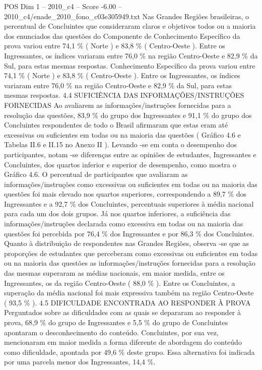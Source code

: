 \begin{textsample}{POS Dim 1 – 2010\_c4 – Score -6.00 – 2010\_c4/enade\_2010\_fono\_c03e305949.txt}
Nas Grandes Regiões brasileiras, o percentual de Concluintes que consideraram claros e objetivos todos ou a maioria dos enunciados das questões do Componente de Conhecimento Específico da prova variou entre 74,1 \% ( Norte ) e 83,8 \% ( Centro-Oeste ).
Entre os Ingressantes, os índices variaram entre 76,0 \% na região Centro-Oeste e 82,9 \% da Sul, para estas mesmas respostas.
Conhecimento Específico da prova variou entre 74,1 \% ( Norte ) e 83,8 \% ( Centro-Oeste ).
Entre os Ingressantes, os índices variaram entre 76,0 \% na região Centro-Oeste e 82,9 \% da Sul, para estas mesmas respostas. 4.4 SUFICIÊNCIA DAS INFORMAÇÕES/INSTRUÇÕES FORNECIDAS Ao avaliarem as informações/instruções fornecidas para a resolução das questões, 83,9 \% do grupo dos Ingressantes e 91,1 \% do grupo dos Concluintes respondentes de todo o Brasil afirmaram que estas eram até excessivas ou suficientes em todas ou na maioria das questões ( Gráfico 4.6 e Tabelas II.6 e II.15 no Anexo II ).
Levando -se em conta o desempenho dos participantes, notam -se diferenças entre as opiniões de estudantes, Ingressantes e Concluintes, dos quartos inferior e superior de desempenho, como mostra o Gráfico 4.6.
O percentual de participantes que avaliaram as informações/instruções como excessivas ou suficientes em todas ou na maioria das questões foi mais elevado nos quartos superiores, correspondendo a 89,7 \% dos Ingressantes e a 92,7 \% dos Concluintes, percentuais superiores à média nacional para cada um dos dois grupos.
Já nos quartos inferiores, a suficiência das informações/instruções declarada como excessiva em todas ou na maioria das questões foi percebida por 76,4 \% dos Ingressantes e por 86,3 \% dos Concluintes.
Quanto à distribuição de respondentes nas Grandes Regiões, observa -se que as proporções de estudantes que perceberam como excessivas ou suficientes em todas ou na maioria das questões as informações/instruções fornecidas para a resolução das mesmas superaram as médias nacionais, em maior medida, entre os Ingressantes, os da região Centro-Oeste ( 88,0 \% ).
Entre os Concluintes, a superação da média nacional foi mais expressiva também na região Centro-Oeste ( 93,5 \% ). 4.5 DIFICULDADE ENCONTRADA AO RESPONDER À PROVA Perguntados sobre as dificuldades com as quais se depararam ao responder à prova, 68,9 \% do grupo de Ingressantes e 5,5 \% do grupo de Concluintes apontaram o desconhecimento do conteúdo.
Concluintes, por sua vez, mencionaram em maior medida a forma diferente de abordagem do conteúdo como dificuldade, apontada por 49,6 \% deste grupo.
Essa alternativa foi indicada por uma parcela menor dos Ingressantes, 14,4 \%.

\end{textsample}
